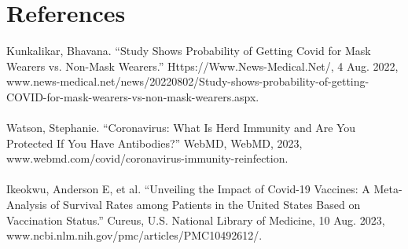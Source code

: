 \documentclass{article}
\begin{document}
\section{References}
Kunkalikar, Bhavana. “Study Shows Probability of Getting Covid for Mask Wearers vs. Non-Mask Wearers.” Https://Www.News-Medical.Net/, 4 Aug. 2022, www.news-medical.net/news/20220802/Study-shows-probability-of-getting-COVID-for-mask-wearers-vs-non-mask-wearers.aspx. \\\\
Watson, Stephanie. “Coronavirus: What Is Herd Immunity and Are You Protected If You Have Antibodies?” WebMD, WebMD, 2023, www.webmd.com/covid/coronavirus-immunity-reinfection. \\\\
Ikeokwu, Anderson E, et al. “Unveiling the Impact of Covid-19 Vaccines: A Meta-Analysis of Survival Rates among Patients in the United States Based on Vaccination Status.” Cureus, U.S. National Library of Medicine, 10 Aug. 2023, www.ncbi.nlm.nih.gov/pmc/articles/PMC10492612/. 
\end{document}
